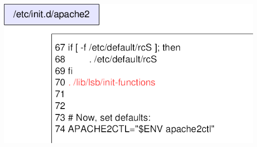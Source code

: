 %
%
%
%
%
%
%
%
%
%
%
%
%
%
%
%
\begin{frame}
\begin{center}
\includegraphics[width=0.8\hsize]{image201510/daemonscript0.png}
\end{center}
\end{frame}

